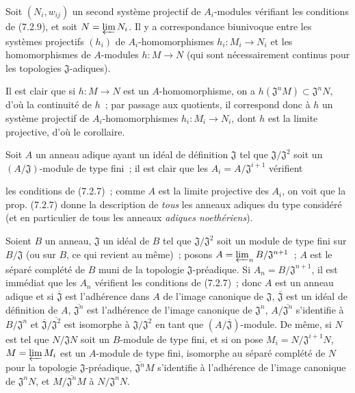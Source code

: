 \begin{corollary}[7.2.10]
\label{0.7.2.10-fr}
Soit $(N_i,w_{ij})$ un second système projectif de $A_i$-modules vérifiant les
conditions de (7.2.9), et soit $N=\varprojlim N_i$. Il y a correspondance
biunivoque entre les systèmes projectifs $(h_i)$ de $A_i$-homomorphismes
$h_i:M_i\to N_i$ et les homomorphismes de $A$-modules $h:M\to N$ (qui sont
nécessairement continus pour les topologies $\mathfrak J$-adiques).
\end{corollary}

Il est clair que si $h:M\to N$ est un $A$-homomorphisme, on a
$h(\mathfrak J^nM)\subset\mathfrak J^nN$, d'où la continuité de $h$~; par
passage aux quotients, il correspond donc à $h$ un système projectif de
$A_i$-homomorphismes $h_i:M_i\to N_i$, dont $h$ est la limite projective,
d'où le corollaire.

\begin{remark}[7.2.11]
\label{0.7.2.11-fr}
Soit $A$ un anneau adique ayant un idéal de définition $\mathfrak J$ tel que
$\mathfrak J/\mathfrak J^2$ soit un $(A/\mathfrak J)$-module de type fini~;
il est clair que les $A_i=A/\mathfrak J^{i+1}$ vérifient


les conditions de (7.2.7)~; comme $A$ est la limite projective des $A_i$, on
voit que la prop. (7.2.7) donne la description de \emph{tous} les anneaux
adiques du type considéré (et en particulier de tous les anneaux
\emph{adiques noethériens}).
\end{remark}

\begin{example}[7.2.12]
\label{0.7.2.12-fr}
Soient $B$ un anneau, $\mathfrak J$ un idéal de $B$ tel que
$\mathfrak J/\mathfrak J^2$ soit un module de type fini sur
$B/\mathfrak J$ (ou sur $B$, ce qui revient au même)~; posons
$A=\varprojlim_n B/\mathfrak J^{n+1}$~; $A$ est le séparé complété de $B$
muni de la topologie $\mathfrak J$-préadique. Si
$A_n=B/\mathfrak J^{n+1}$, il est immédiat que les $A_n$ vérifient les
conditions de (7.2.7)~; donc $A$ est un anneau adique et si
$\overline{\mathfrak J}$ est l'adhérence dans $A$ de l'image canonique de
$\mathfrak J$, $\overline{\mathfrak J}$ est un idéal de définition de $A$,
$\overline{\mathfrak J^n}$ est l'adhérence de l'image canonique de
$\mathfrak J^n$, $A/\overline{\mathfrak J^n}$ s'identifie à
$B/\mathfrak J^n$ et
$\overline{\mathfrak J}/\overline{\mathfrak J^2}$ est isomorphe à
$\mathfrak J/\mathfrak J^2$ en tant que
$(A/\overline{\mathfrak J})$-module. De même, si $N$ est tel que
$N/\mathfrak JN$ soit un $B$-module de type fini, et si on pose
$M_i=N/\mathfrak J^{i+1}N$, $M=\varprojlim M_i$ est un $A$-module de type
fini, isomorphe au séparé complété de $N$ pour la topologie
$\mathfrak J$-préadique, $\overline{\mathfrak J^n}M$ s'identifie à
l'adhérence de l'image canonique de $\mathfrak J^nN$, et
$M/\overline{\mathfrak J^n}M$ à $N/\mathfrak J^nN$.
\end{example}

